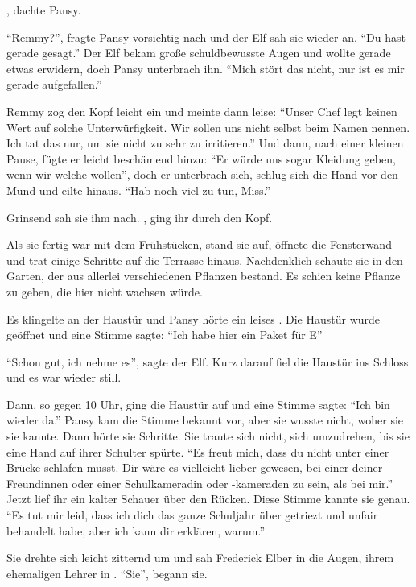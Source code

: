 , dachte Pansy. 

\enquote{Remmy?}, fragte Pansy vorsichtig nach und der Elf sah sie wieder an. \enquote{Du hast gerade  gesagt.} Der Elf bekam große schuldbewusste Augen und wollte gerade etwas erwidern, doch Pansy unterbrach ihn. \enquote{Mich stört das nicht, nur ist es mir gerade aufgefallen.}

Remmy zog den Kopf leicht ein und meinte dann leise: \enquote{Unser Chef legt keinen Wert auf solche Unterwürfigkeit. Wir sollen uns nicht selbst beim Namen nennen. Ich tat das nur, um sie nicht zu sehr zu irritieren.} Und dann, nach einer kleinen Pause, fügte er leicht beschämend hinzu: \enquote{Er würde uns sogar Kleidung geben, wenn wir welche wollen}, doch er unterbrach sich, schlug sich die Hand vor den Mund und eilte hinaus. \enquote{Hab noch viel zu tun, Miss.}

Grinsend sah sie ihm nach. , ging ihr durch den Kopf.

Als sie fertig war mit dem Frühstücken, stand sie auf, öffnete die Fensterwand und trat einige Schritte auf die Terrasse hinaus. Nachdenklich schaute sie in den Garten, der aus allerlei verschiedenen Pflanzen bestand. Es schien keine Pflanze zu geben, die hier nicht wachsen würde.

Es klingelte an der Haustür und Pansy hörte ein leises . Die Haustür wurde geöffnet und eine Stimme sagte: \enquote{Ich habe hier ein Paket für E\agst}

\enquote{Schon gut, ich nehme es}, sagte der Elf. Kurz darauf fiel die Haustür ins Schloss und es war wieder still.

Dann, so gegen 10 Uhr, ging die Haustür auf und eine Stimme sagte: \enquote{Ich bin wieder da.} Pansy kam die Stimme bekannt vor, aber sie wusste nicht, woher sie sie kannte. Dann hörte sie Schritte. Sie traute sich nicht, sich umzudrehen, bis sie eine Hand auf ihrer Schulter spürte. \enquote{Es freut mich, dass du nicht unter einer Brücke schlafen musst. Dir wäre es vielleicht lieber gewesen, bei einer deiner Freundinnen oder einer Schulkameradin oder -kameraden zu sein, als bei mir.} Jetzt lief ihr ein kalter Schauer über den Rücken. Diese Stimme kannte sie genau. \enquote{Es tut mir leid, dass ich dich das ganze Schuljahr über getriezt und unfair behandelt habe, aber ich kann dir erklären, warum.}

Sie drehte sich leicht zitternd um und sah Frederick Elber in die Augen, ihrem ehemaligen Lehrer in \VgddK. \enquote{Sie\gst}, begann sie.

